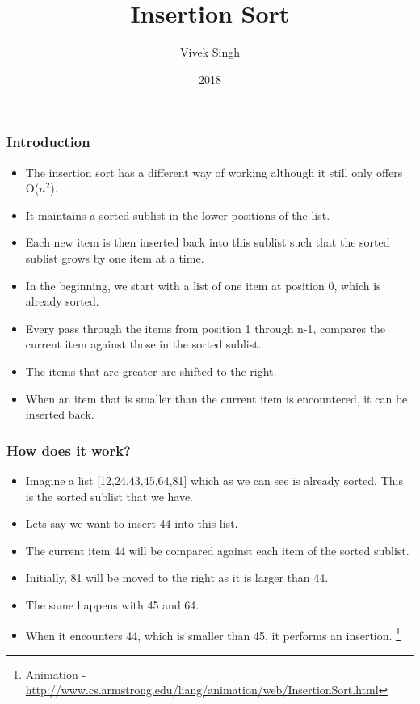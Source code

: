 \documentclass{beamer}
\title{Insertion Sort}
\author{Vivek Singh}
\institute{Information Systems Decision Sciences (ISDS)\\
MUMA College of Business\\
University of South Florida \\
Tampa, Florida}
\date{2018}
\begin{document}
\frame{\titlepage}
\begin{frame}
\frametitle{Introduction}
\begin{itemize}
\item The insertion sort has  a different way of working although it still only offers O($n^2$).
\item It maintains a sorted sublist in the lower positions of the list.
\item Each new item is then inserted back into this sublist such that the sorted sublist grows by one item at a time.
\item In the beginning, we start with a list of one item at position 0, which is already sorted.
\item Every pass through the items from position 1 through n-1, compares the current item against those in the sorted sublist.
\item The items that are greater are shifted to the right.
\item When an item that is smaller than the current item is encountered, it can be inserted back.
\end{itemize}
\end{frame}


\begin{frame}
\frametitle{How does it work?}
\begin{itemize}
\item Imagine a list [12,24,43,45,64,81] which as we can see is already sorted. This  is the sorted sublist that we have.
\item Lets say we want to insert 44 into this list.
\item The current item 44 will be compared against each item of the sorted sublist.
\item Initially, 81 will be moved to the right as it is larger than 44. 
\item The same happens with 45 and 64.
\item When it encounters 44, which is smaller than 45, it performs an insertion.
\footnote{Animation - \url{http://www.cs.armstrong.edu/liang/animation/web/InsertionSort.html}}
\end{itemize}
\end{frame}
\end{document}
